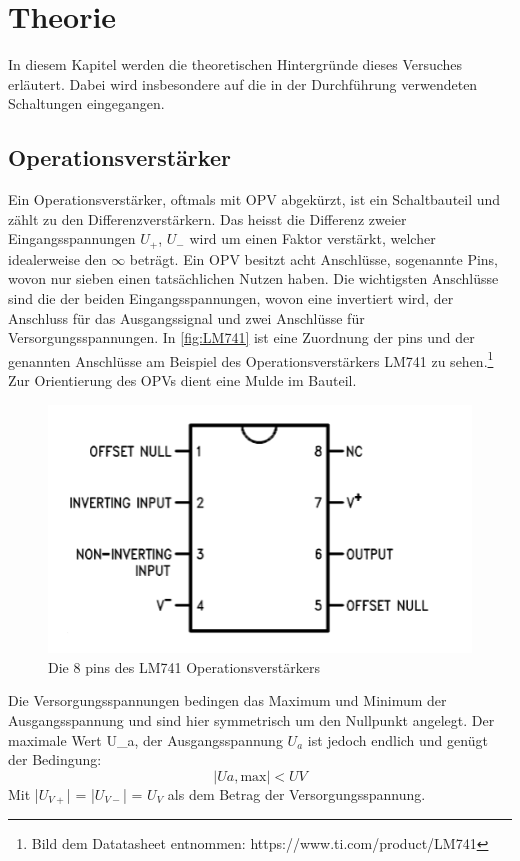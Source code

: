 \section{Theorie} 
\label{sec:Theorie}

In diesem Kapitel werden die theoretischen Hintergründe dieses Versuches erläutert. Dabei wird insbesondere auf die in der Durchführung verwendeten Schaltungen eingegangen.

\subsection{Operationsverstärker}\label{thopv}

Ein Operationsverstärker, oftmals mit OPV abgekürzt, ist ein Schaltbauteil und zählt zu den Differenzverstärkern.
Das heisst die Differenz zweier Eingangsspannungen $U_+$, $U_-$ wird um einen Faktor verstärkt, welcher idealerweise den $\infty$ beträgt.
Ein OPV besitzt acht Anschlüsse, sogenannte Pins, wovon nur sieben einen tatsächlichen Nutzen haben. 
Die wichtigsten Anschlüsse sind die der beiden Eingangsspannungen, wovon eine invertiert wird, der Anschluss für das Ausgangssignal und zwei Anschlüsse für Versorgungsspannungen.
In \autoref{fig:LM741} ist eine Zuordnung der pins und der genannten Anschlüsse am Beispiel des Operationsverstärkers LM741 zu sehen.\footnote{Bild dem Datatasheet entnommen: https://www.ti.com/product/LM741} 
Zur Orientierung des OPVs dient eine Mulde im Bauteil. 
\begin{figure}
    \centering
    \includegraphics[width=1\textwidth]{content/grafiken/LM741.png}
    \caption{Die 8 pins des LM741 Operationsverstärkers}
    \label{fig:LM741}
\end{figure}
Die Versorgungsspannungen bedingen das Maximum und Minimum der Ausgangsspannung und sind hier symmetrisch um den Nullpunkt angelegt. 
Der maximale Wert U_{a,} der Ausgangsspannung $U_a$ ist jedoch endlich und genügt der Bedingung:
\begin{equation} 
|U{a,\text{max}}| < U{V} 
\end{equation} 
Mit |$U_{V+}$| = |$U_{V-}$| = $U_V$ als dem Betrag der Versorgungsspannung.\\


